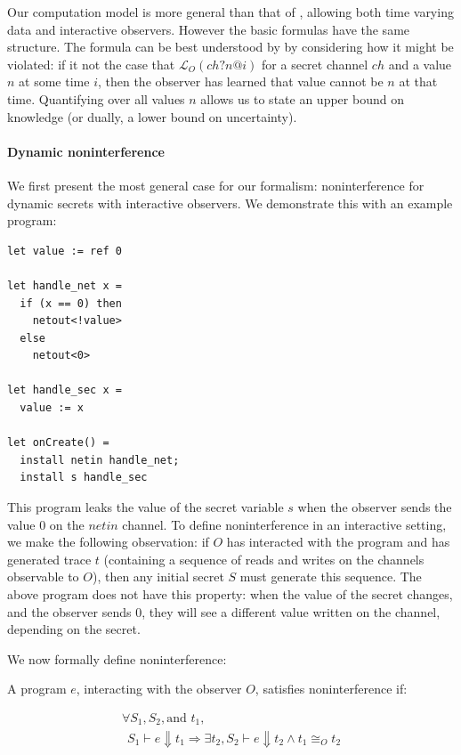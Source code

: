 \documentclass[conference]{IEEEtran}
\newcommand{\code}[1]{\text{\lstinline!#1!}}
\theoremstyle{definition}
\newcommand{\prin}{\textit{O}}
\newcommand{\tr}{t\xspace}
\newcommand{\tpossible}[1]{\mathcal{L}_{#1}}
\begin{document}
Our computation model is more general than that of \cite{Balliu:11},
allowing both time varying data and interactive observers.  However
the basic formulas have the same structure.  The formula can be best
understood by by considering how it might be violated: if it not the
case that $\tpossible{\prin} (ch?n@i)$ for a secret channel $ch$ and a
value $n$ at some time $i$, then the observer has learned that value
cannot be $n$ at that time.  Quantifying over all values $n$ allows us
to state an upper bound on knowledge (or dually, a lower bound on
uncertainty).

\paragraph*{Dynamic noninterference}

We first present the most general case for our formalism:
noninterference for dynamic secrets with interactive observers.
We demonstrate this with an example program:

\begin{lstlisting}[name=Ex]
let value := ref 0

let handle_net x =
  if (x == 0) then
    netout<!value>
  else
    netout<0>
    
let handle_sec x = 
  value := x

let onCreate() =
  install netin handle_net;
  install s handle_sec
\end{lstlisting}

This program leaks the value of the secret variable $s$ when the
observer sends the value $0$ on the $netin$ channel.  To define
noninterference in an interactive setting, we make the following
observation: if $\prin$ has interacted with the program and has
generated trace $\tr$ (containing a sequence of reads and writes on
the channels observable to $\prin$), then any initial secret $S$ must
generate this sequence.  The above program does not have this
property: when the value of the secret changes, and the observer sends
$0$, they will see a different value written on the \code{netout}
channel, depending on the secret.

We now formally define noninterference:

\begin{Definition}[Noninterference]
  \label{defn:noninterference}
  A program $e$, interacting with the observer $\prin$, satisfies
  noninterference if:

  \begin{displaymath}
    \begin{array}{l}
      \forall S_1, S_2, \text{and~} \tr_1, \\
      ~~ S_1 \vdash e \Downarrow \tr_1 \Rightarrow \exists \tr_2, S_2
      \vdash e \Downarrow \tr_2
      \land \tr_1 \cong_{\prin} \tr_2
    \end{array}
  \end{displaymath}
\end{Definition}
\end{document}
